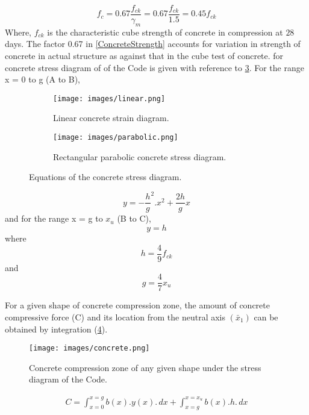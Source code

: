 \begin{equation}
f_c = 0.67\frac{f_{ck}}{\gamma_m} = 0.67\frac{f_{ck}}{1.5}=0.45 f_{ck}
\label{ConcreteStrength}
\end{equation}
Where, $f_{ck}$ is the characteristic cube strength of concrete in
compression at $28$ days. The factor 0.67 in \eqn \ref{ConcreteStrength}
accounts for variation in strength of concrete in actual structure as
against that in the cube test of concrete. {\eqn} for concrete stress diagram
of  of the Code is given with reference to
\fig \ref{fig:Equations of the concrete stress diagram}. For the
range x = 0 to g (A to B),
\begin{figure}
\begin{subfigure}{0.5\textwidth}
\centering
\texttt{[image: images/linear.png]}
\caption{Linear concrete strain diagram.}
\label{fig:linear}
\end{subfigure}
%
\begin{subfigure}{0.5\textwidth}
\centering
\texttt{[image: images/parabolic.png]}
\caption{Rectangular parabolic concrete stress diagram.}
\label{fig:parabolic}
\end{subfigure}
\caption{Equations of the concrete stress diagram.}
\label{fig:Equations of the concrete stress diagram}
\end{figure}

\begin{equation}
y=-\frac{h}{g}^2.x^2+\frac{2h}{g} x
\label{ConcreteStress1}  
\end{equation}
and for the range x = g to $x_{u}$ (B to C),
\begin{equation}
y=h
\label{ConcreteStress2}
\end{equation}
where
$$h=\frac{4}{9}f_{ck}$$
and
$$g=\frac{4}{7}x_u$$

For a given shape of concrete compression zone, the amount of concrete
compressive force (C) and its location from the neutral axis ${(\bar x_1)}$
can be obtained by integration (\fig \ref{fig:ConcreteCompressionZone}).
\begin{figure}
\centering
\texttt{[image: images/concrete.png]}
\caption{Concrete compression zone of any given shape under the stress diagram of the Code.}
\label{fig:ConcreteCompressionZone}
\end{figure}
\begin{align}
C=\int_{x=0}^{x=g}b(x).y(x).\,dx+\int_{{x=g}}^{x=x_u}b(x).h.\,dx
\label{ConcreteCompressionForce1}
\end{align}

